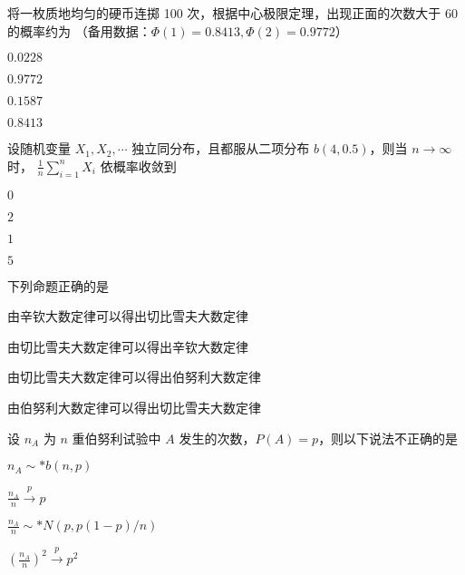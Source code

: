 \documentclass{exam-zh}
\begin{document}
\begin{question}
  将一枚质地均匀的硬币连掷 100 次，根据中心极限定理，出现正面的次数大于 60 的概率约为
  （备用数据：$\Phi(1) = 0.8413, \Phi(2) = 0.9772$）
  \paren[A]

  \begin{choices}
    \item $0.0228$
    \item $0.9772$
    \item $0.1587$
    \item $0.8413$
  \end{choices}
\end{question}

\begin{question}
  设随机变量 $X_1, X_2, \cdots$ 独立同分布，且都服从二项分布 $b(4,0.5)$，则当 $n \to \infty$ 时，
  $\frac{1}{n} \sum_{i=1}^{n} X_i$
  依概率收敛到 \paren[B]
  \begin{choices}
    \item $0$
    \item $2$
    \item $1$
    \item $5$
  \end{choices}
\end{question}

\begin{question}
  下列命题正确的是 \paren[C]
  \begin{choices}
    \item 由辛钦大数定律可以得出切比雪夫大数定律
    \item 由切比雪夫大数定律可以得出辛钦大数定律
    \item 由切比雪夫大数定律可以得出伯努利大数定律
    \item 由伯努利大数定律可以得出切比雪夫大数定律
  \end{choices}
\end{question}

\begin{question}
  设 $n_A$ 为 $n$ 重伯努利试验中 $A$ 发生的次数，$P(A) = p$，则以下说法不正确的是 \paren[C]
  \begin{choices}
    \item 
    $n_A \sim* b(n, p)$
    
    \item 
    $\frac{n_A}{n} \xrightarrow{p} p$
    
    \item 
    $\frac{n_A}{n} \sim* N(p, p(1-p)/n)$
    
    \item 
    $\left(\frac{n_A}{n}\right)^2 \xrightarrow{p} p^2$
  \end{choices}
\end{question}
\end{document}
